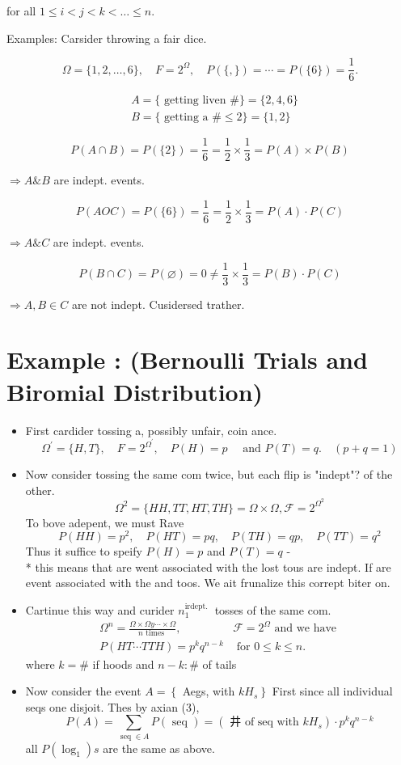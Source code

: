 \documentclass[10pt]{article}
\begin{document}
for all \(1 \leq i<j<k<\ldots \leq n\).

Examples: Carsider throwing a fair dice.

\[
\Omega=\{1,2, \ldots, 6\}, \quad F=2^{\Omega}, \quad P(\{,\})=\cdots=P(\{6\})=\frac{1}{6} .
\]

\[
\begin{aligned}
& A=\{\text { getting liven } \#\}=\{2,4,6\} \\
& B=\{\text { getting a } \# \leqslant 2\}=\{1,2\}
\end{aligned}
\]

\[
P(A \cap B)=P(\{2\})=\frac{1}{6}=\frac{1}{2} \times \frac{1}{3}=P(A) \times P(B)
\]

\(\Rightarrow A \& B\) are indept. events.

\[
P(A O C)=P(\{6\})=\frac{1}{6}=\frac{1}{2} \times \frac{1}{3}=P(A) \cdot P(C)
\]

\(\Rightarrow A \& C\) are indept. events.

\[
P(B \cap C)=P(\varnothing)=0 \neq \frac{1}{3} \times \frac{1}{3}=P(B) \cdot P(C)
\]

\(\Rightarrow A, B \in C\) are not indept. Cusidersed trather.

\section*{Example : (Bernoulli Trials and Biromial Distribution)}
\begin{itemize}
  \item[-] First cardider tossing a, possibly unfair, coin ance.
\[
\Omega^{\prime}=\{H, T\}, \quad F=2^{\Omega^{\prime}}, \quad P(H)=p \quad \text { and } P(T)=q . \quad(p+q=1)
\]
  \item[-] Now consider tossing the same com twice, but each flip is "indept"? of the other.
\[
\Omega^{2}=\{H H, T T, H T, T H\}=\Omega \times \Omega, \mathcal{F}=2^{\Omega^{2}}
\]
To bove adepent, we must Rave
\[
P(H H)=p^{2}, \quad P(H T)=p q, \quad P(T H)=q p, \quad P(T T)=q^{2}
\]
Thus it suffice to speify \(P(H)=p\) and \(P(T)=q\) -\\
* this means that are went associated with the lost tous are indept. If are event associated with the and toos. We ait frunalize this corrept biter on.
  \item[-] Cartinue this way and curider \(n_{1}^{\text {irdept. }}\) tosses of the same com.
\[
\begin{array}{ll}
\Omega^{n}=\frac{\Omega \times \Omega y \cdots \times \Omega}{n \text { times }}, & \mathcal{F}=2^{\Omega} \text { and we have } \\
P(H T \cdots T T H)=p^{k} q^{n-k} & \text { for } 0 \leq k \leq n .
\end{array}
\]
where \(k=\#\) if hoods and \(n-k: \#\) of tails
  \item[-] Now consider the event \(A=\left\{\right.\) Aegs, with \(\left.k H_{s}\right\}\) First since all individual seqs one disjoit. Thes by axian (3),
\[
P(A)=\sum_{\operatorname{seq} \in A} P(\text { seq })=\left(\text { 井 of seq with } k H_{s}\right) \cdot p^{k} q^{n-k}
\]
all \(P\left(\log _{1}\right) s\) are the same as above.
\end{itemize}
\end{document}
